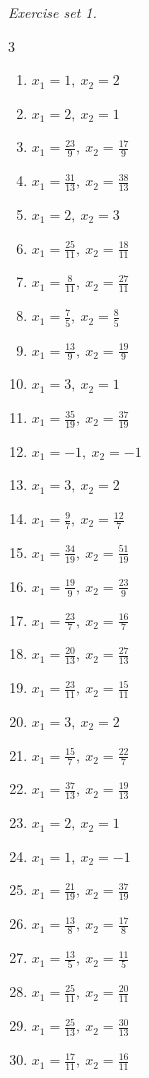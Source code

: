 \par\noindent\emph{Exercise set 1.}\nopagebreak
\begin{multicols}{3}\raggedright
\begin{enumerate}[label=\arabic*., leftmargin=*, itemsep=1pt]
\item $x_1=1,\ x_2=2$
\item $x_1=2,\ x_2=1$
\item $x_1=\frac{23}{9},\ x_2=\frac{17}{9}$
\item $x_1=\frac{31}{13},\ x_2=\frac{38}{13}$
\item $x_1=2,\ x_2=3$
\item $x_1=\frac{25}{11},\ x_2=\frac{18}{11}$
\item $x_1=\frac{8}{11},\ x_2=\frac{27}{11}$
\item $x_1=\frac{7}{5},\ x_2=\frac{8}{5}$
\item $x_1=\frac{13}{9},\ x_2=\frac{19}{9}$
\item $x_1=3,\ x_2=1$
\item $x_1=\frac{35}{19},\ x_2=\frac{37}{19}$
\item $x_1=-1,\ x_2=-1$
\item $x_1=3,\ x_2=2$
\item $x_1=\frac{9}{7},\ x_2=\frac{12}{7}$
\item $x_1=\frac{34}{19},\ x_2=\frac{51}{19}$
\item $x_1=\frac{19}{9},\ x_2=\frac{23}{9}$
\item $x_1=\frac{23}{7},\ x_2=\frac{16}{7}$
\item $x_1=\frac{20}{13},\ x_2=\frac{27}{13}$
\item $x_1=\frac{23}{11},\ x_2=\frac{15}{11}$
\item $x_1=3,\ x_2=2$
\item $x_1=\frac{15}{7},\ x_2=\frac{22}{7}$
\item $x_1=\frac{37}{13},\ x_2=\frac{19}{13}$
\item $x_1=2,\ x_2=1$
\item $x_1=1,\ x_2=-1$
\item $x_1=\frac{21}{19},\ x_2=\frac{37}{19}$
\item $x_1=\frac{13}{8},\ x_2=\frac{17}{8}$
\item $x_1=\frac{13}{5},\ x_2=\frac{11}{5}$
\item $x_1=\frac{25}{11},\ x_2=\frac{20}{11}$
\item $x_1=\frac{25}{13},\ x_2=\frac{30}{13}$
\item $x_1=\frac{17}{11},\ x_2=\frac{16}{11}$
\end{enumerate}
\end{multicols}

